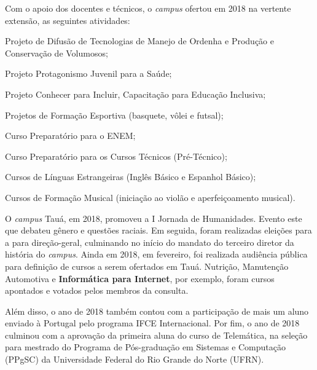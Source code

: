 Com o apoio dos docentes e técnicos, o \textit{campus} ofertou em 2018 na vertente extensão, as seguintes atividades:
\begin{alineas}
    \setlength\itemsep{0em}
    \item Projeto de Difusão de Tecnologias de Manejo de Ordenha e Produção e Conservação de Volumosos;
    \item  Projeto Protagonismo Juvenil para a Saúde;
    \item  Projeto Conhecer para Incluir, Capacitação para Educação Inclusiva;
    \item  Projetos de Formação Esportiva (basquete, vôlei e futsal);
    \item  Curso Preparatório para o ENEM;
    \item  Curso Preparatório para os Cursos Técnicos (Pré-Técnico);
    \item  Cursos de Línguas Estrangeiras (Inglês Básico e Espanhol Básico);
    \item  Cursos de Formação Musical (iniciação ao violão e aperfeiçoamento musical).
\end{alineas}

O \textit{campus} Tauá, em 2018, promoveu a I Jornada de Humanidades. Evento este que debateu  gênero e questões raciais. Em seguida, foram realizadas eleições para a para direção-geral, culminando no início do mandato do terceiro diretor da história do \textit{campus}. Ainda em 2018, em fevereiro, foi realizada audiência pública  para definição de cursos a serem ofertados em Tauá. Nutrição, Manutenção Automotiva e \textbf{Informática para Internet}, por exemplo, foram cursos  apontados e votados pelos membros da consulta. 

Além disso,  o ano de 2018 também contou com a participação de mais um aluno enviado à Portugal pelo programa  IFCE Internacional. Por fim, o ano de 2018 culminou com a aprovação da primeira aluna do curso de Telemática, na seleção para mestrado do Programa de Pós-graduação em Sistemas e Computação (PPgSC) da Universidade Federal do Rio Grande do Norte (UFRN).


